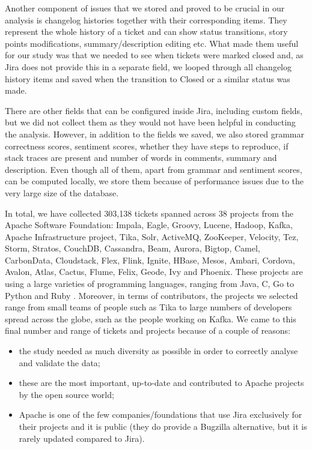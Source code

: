 \documentclass{mpaper}
\begin{document}
Another component of issues that we stored and proved to be crucial in our analysis is changelog histories together with their 
corresponding items. They represent the whole history of a ticket and can show status transitions, story points modifications, 
summary/description editing etc. What made them useful for our study was that we needed to see when tickets were marked closed and, 
as Jira does not provide this in a separate field, we looped through all changelog history items and saved when the transition to 
Closed or a similar status was made. 

There are other fields that can be configured inside Jira, including custom fields, but we did not collect them as they would not 
have been helpful in conducting the analysis. However, in addition to the fields we saved, we also stored grammar correctness scores, 
sentiment scores, whether they have steps to reproduce, if stack traces are present and number of words in comments, summary and description. 
Even though all of them, apart from grammar and sentiment scores, can be computed locally, we store them because of performance issues
due to the very large size of the database. 

In total, we have collected 303,138 tickets spanned across 38 projects from the Apache Software Foundation: Impala, Eagle, Groovy, Lucene,
Hadoop, Kafka, Apache Infrastructure project, Tika, Solr, ActiveMQ, ZooKeeper, Velocity, Tez, Storm, Stratos, CouchDB, Cassandra, 
Beam, Aurora, Bigtop, Camel, CarbonData, Cloudstack, Flex, Flink, Ignite, HBase, Mesos, Ambari, Cordova, Avalon, Atlas, 
Cactus, Flume, Felix, Geode, Ivy and Phoenix. These projects are using a large varieties of programming languages, ranging from Java, C, 
Go to Python and Ruby \cite{apache_projects}. Moreover, in terms of contributors, the projects we selected range from small teams of people
such as Tika to large numbers of developers spread across the globe, such as the people working on Kafka. We came to this final number 
and range of tickets and projects because of a couple of reasons: 
\begin{itemize}
  \item the study needed as much diversity as possible in order to correctly analyse and validate the data;
  \item these are the most important, up-to-date and contributed to Apache projects by the open source world;
  \item Apache is one of the few companies/foundations that use Jira exclusively for their projects and it is public (they do 
  provide a Bugzilla alternative, but it is rarely updated compared to Jira).
\end{itemize}
\end{document}
